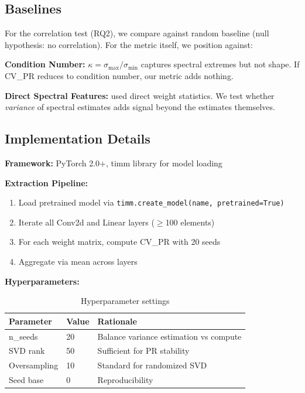 \subsection{Baselines}

For the correlation test (RQ2), we compare against random baseline (null hypothesis: no correlation). For the metric itself, we position against:

\textbf{Condition Number:} $\kappa = \sigma_{\max} / \sigma_{\min}$ captures spectral extremes but not shape. If CV\_PR reduces to condition number, our metric adds nothing.

\textbf{Direct Spectral Features:} \citet{unterthiner2020predicting} used direct weight statistics. We test whether \emph{variance} of spectral estimates adds signal beyond the estimates themselves.

\subsection{Implementation Details}

\textbf{Framework:} PyTorch 2.0+, timm library for model loading

\textbf{Extraction Pipeline:}
\begin{enumerate}
    \item Load pretrained model via \texttt{timm.create\_model(name, pretrained=True)}
    \item Iterate all Conv2d and Linear layers ($\geq$100 elements)
    \item For each weight matrix, compute CV\_PR with 20 seeds
    \item Aggregate via mean across layers
\end{enumerate}

\textbf{Hyperparameters:}

\begin{table}[h]
\centering
\caption{Hyperparameter settings}
\label{tab:hyperparams}
\begin{tabular}{@{}lll@{}}
\toprule
Parameter & Value & Rationale \\
\midrule
n\_seeds & 20 & Balance variance estimation vs compute \\
SVD rank & 50 & Sufficient for PR stability \\
Oversampling & 10 & Standard for randomized SVD \\
Seed base & 0 & Reproducibility \\
\bottomrule
\end{tabular}
\end{table}

